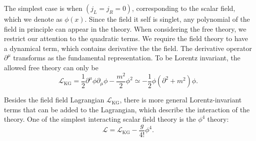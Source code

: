 \documentclass[aps,prb,superscriptaddress,nofootinbib]{revtex4}
\begin{document}
The simplest case is when $(j_L=j_R = 0)$, corresponding to the scalar field, which we denote as $\phi(x)$.
Since the field it self is singlet, any polynomial of the field in principle can appear in the theory.
When considering the free theory, we restrict our attention to the quadratic terms.
We require the field theory to have a dynamical term, which contains derivative the the field.
The derivative operator $\partial^\mu$ transforms as the fundamental representation.
To be Lorentz invariant, the allowed free theory can only be
\begin{equation}
	\mathcal L_{\mathrm{KG}} = \frac{1}{2}\partial^\mu \phi \partial_\mu \phi -\frac{m^2}{2}\phi^2 
	\simeq -\frac{1}{2}\phi (\partial^2+m^2) \phi.
\end{equation}

Besides the field field Lagrangian $\mathcal L_{\mathrm{KG}}$, there is more general Lorentz-invariant terms that can be added to the Lagrangian, which describe the interaction of the theory.
One of the simplest interacting scalar field theory is the $\phi^4$ theory:
\begin{equation}
	\mathcal L = \mathcal L_{\mathrm{KG}} - \frac{g}{4!}\phi^4.
\end{equation}
\end{document}
